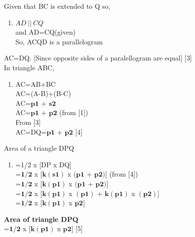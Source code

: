 \documentclass[journal,12pt,twocolumn]{IEEEtran}
\begin{document}
\begin{tableofcontents}
\begin{flushleft}
\vspace{0.1cm}
Given that BC is extended to Q so,\\ 
\begin{enumerate}
\item[]
$ AD \: || \: CQ $\\ and AD=CQ(given)\\ So, ACQD is a parallelogram\\
\end{enumerate}
\vspace{0.1cm}
AC=DQ. [Since opposite sides of a paralellogram are equal]
 \hspace{4.5cm} [3] \\
\vspace{0.1cm}
In triangle ABC,\\ 
\begin{enumerate}
\item[]
AC=AB+BC\\    AC=(A-B)+(B-C)\\   AC=$\boldsymbol{p1}$ + $\boldsymbol{s2}$\\
AC=$\boldsymbol{p1}$ + $\boldsymbol{p2}$ (from [1])\\
 From [3]\\ AC=DQ=$\boldsymbol{p1}$ + $\boldsymbol{p2}$ \hspace{2cm}[4]\\
\end{enumerate} 
Area of a triangle DPQ\\
\begin{enumerate}
\item[]
=1/2 x [DP x DQ]\\
=$\boldsymbol{1/2}$ x $\boldsymbol{[k(s1)}$ x $\boldsymbol{(p1}$ + $\boldsymbol{p2})]$ (from [4])\\ 
=$\boldsymbol{1/2}$ x $\boldsymbol{[k(p1)}$ x $\boldsymbol{(p1}$ + $\boldsymbol{p2})]$\\
=$\boldsymbol{1/2}$ x $\boldsymbol{[k(p1)}$ x $\boldsymbol{(p1)}$ + $\boldsymbol{k(p1)}$ x $\boldsymbol{(p2)}]$\\ 
=$\boldsymbol{1/2}$ x $\boldsymbol{[k(p1)}$ x $\boldsymbol{p2}]$\\
\end{enumerate}
\textbf{Area of triangle DPQ}\\
\vspace{0.1cm}
=$\boldsymbol{1/2}$ x $\boldsymbol{[k(p1)}$ x $\boldsymbol{p2}]$ \hspace{2.5cm} [5]\\
\vspace{0.1cm}

\end{flushleft}
\end{tableofcontents}
\end{document}
